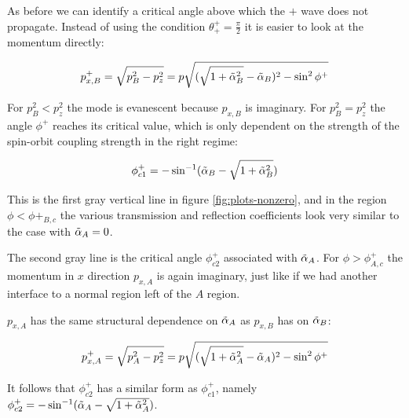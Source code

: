 As before we can identify a critical angle above which the $+$ wave
does not propagate. Instead of using the condition $\theta^+_+ =
\frac{\pi}{2}$ it is easier to look at the momentum directly:

\begin{align}
    p_{x,B}^+ = \sqrt{ p_B^2 - p_z^2} = p \sqrt{(\sqrt{1+\tilde \alpha_B^2} -
            \tilde \alpha_B)^2 - \sin^2 \phi^+}
\end{align}

For $p_B^2 < p_z^2$ the mode is evanescent because $p_{x,B}$ is
imaginary. For $p_B^2 = p_z^2$ the angle $\phi^+$ reaches its critical
value, which is only dependent on the strength of the spin-orbit
coupling strength in the right regime:

\begin{align}
    \phi^+_{c1} = -\sin^{-1}(\tilde \alpha_B - \sqrt{1+\tilde \alpha_B^2})
\end{align}

This is the first gray vertical line in figure
\ref{fig:plots-nonzero}, and in the region $\phi < \phi+_{B,c}$ the various transmission and reflection
coefficients look very similar to the case with $\tilde \alpha_A = 0$.

The second gray line is the critical angle $\phi^+_{c2}$ associated with
$\tilde \alpha_A$. For
$\phi > \phi^+_{A,c}$ the momentum in $x$ direction $p_{x,A}$ is again
imaginary, just like if we had another interface to a normal region
left of the $A$ region. 

$p_{x,A}$ has the same structural dependence on $\tilde \alpha_A$ as $p_{x,B}$
has on $\tilde \alpha_B$:

\begin{align}
    p_{x,A}^+ = \sqrt{ p_A^2 - p_z^2} = p \sqrt{(\sqrt{1+\tilde \alpha_A^2} -
            \tilde \alpha_A)^2 - \sin^2 \phi^+}
\end{align}

It follows that $\phi^+_{c2}$ has a similar form as $\phi^+_{c1}$,
namely $\phi^+_{c2} = -\sin^{-1}(\tilde \alpha_A - \sqrt{1+\tilde \alpha_A^2})$.

%
%

